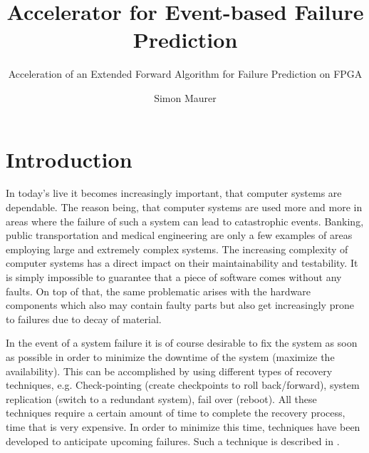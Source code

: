\documentclass[mscthesis]{usiinfthesis}
\title{Accelerator for Event-based Failure Prediction} %
\subtitle{Acceleration of an Extended Forward Algorithm for Failure Prediction
    on FPGA}
\author{Simon Maurer} %
\begin{document}
\maketitle %

\frontmatter %

\begin{abstract}
\end{abstract}

%

\begin{acknowledgements}
\end{acknowledgements}

\tableofcontents 
\listoffigures %
\listoftables %
\lstlistoflistings

\mainmatter

\chapter{Introduction}
\label{ch:intro}
In today's live it becomes increasingly important, that computer systems are
dependable. The reason being, that computer systems are used more and more in
areas where the failure of such a system can lead to catastrophic events.
Banking, public transportation and medical engineering are only a few examples
of areas employing large and extremely complex systems. The increasing
complexity of computer systems has a direct impact on their maintainability and
testability. It is simply impossible to guarantee that a piece of software comes
without any faults. On top of that, the same problematic arises with the
hardware components which also may contain faulty parts but also get
increasingly prone to failures due to decay of material.

In the event of a system failure it is of course desirable to fix the system as
soon as possible in order to minimize the downtime of the system (maximize the
availability). This can be accomplished by using different types of recovery
techniques, e.g. Check-pointing (create checkpoints to roll back/forward),
system replication (switch to a redundant system), fail over (reboot). All these
techniques require a certain amount of time to complete the recovery process,
time that is very expensive. In order to minimize this time, techniques have
been developed to anticipate upcoming failures. Such a technique is described in
\cite{salfner08}.
\end{document}
